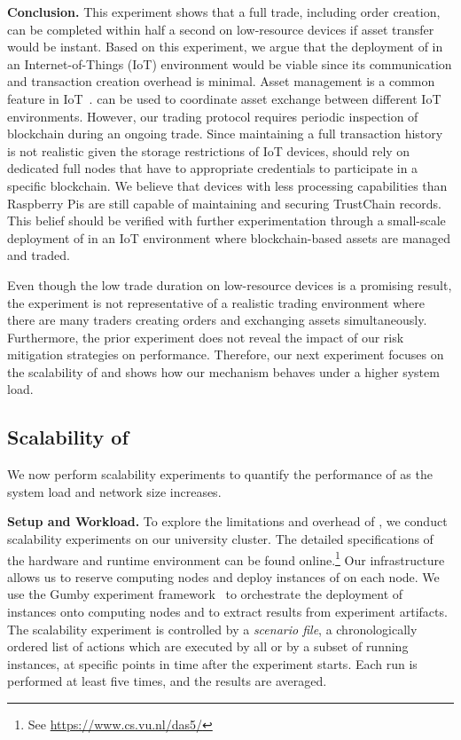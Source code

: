 \textbf{Conclusion.}
This experiment shows that a full trade, including order creation, can be completed within half a second on low-resource devices if asset transfer would be instant.
Based on this experiment, we argue that the deployment of \ModelName{} in an Internet-of-Things (IoT) environment would be viable since its communication and transaction creation overhead is minimal.
Asset management is a common feature in IoT~\cite{gilchrist2016industry}.
\ModelName{} can be used to coordinate asset exchange between different IoT environments.
However, our trading protocol requires periodic inspection of blockchain during an ongoing trade.
Since maintaining a full transaction history is not realistic given the storage restrictions of IoT devices, \ModelName{} should rely on dedicated full nodes that have to appropriate credentials to participate in a specific blockchain.
We believe that devices with less processing capabilities than Raspberry Pis are still capable of maintaining and securing TrustChain records.
This belief should be verified with further experimentation through a small-scale deployment of \ModelName{} in an IoT environment where blockchain-based assets are managed and traded.

Even though the low trade duration on low-resource devices is a promising result, the experiment is not representative of a realistic trading environment where there are many traders creating orders and exchanging assets simultaneously.
Furthermore, the prior experiment does not reveal the impact of our risk mitigation strategies on performance.
Therefore, our next experiment focuses on the scalability of \ModelName{} and shows how our mechanism behaves under a higher system load.

\subsection{Scalability of \ModelName{}}
\label{subsec:scalability_experiment}
We now perform scalability experiments to quantify the performance of \ModelName{} as the system load and network size increases.

\textbf{Setup and Workload.}
To explore the limitations and overhead of \ModelName{}, we conduct scalability experiments on our university cluster.
The detailed specifications of the hardware and runtime environment can be found online.\footnote{See \url{https://www.cs.vu.nl/das5/}}
Our infrastructure allows us to reserve computing nodes and deploy instances of \ModelName{} on each node.
We use the Gumby experiment framework~\cite{gumby} to orchestrate the deployment of \ModelName{} instances onto computing nodes and to extract results from experiment artifacts.
The scalability experiment is controlled by a \emph{scenario file}, a chronologically ordered list of actions which are executed by all or by a subset of running instances, at specific points in time after the experiment starts.
Each run is performed at least five times, and the results are averaged.

